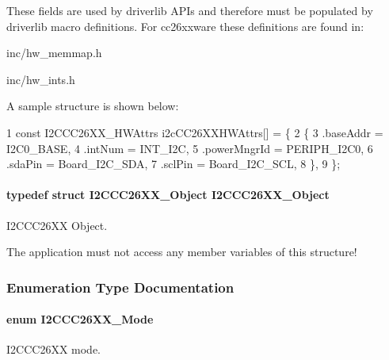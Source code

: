 These fields are used by driverlib A\+P\+Is and therefore must be populated by driverlib macro definitions. For cc26xxware these definitions are found in\+:
\begin{DoxyItemize}
\item inc/hw\+\_\+memmap.\+h
\item inc/hw\+\_\+ints.\+h
\end{DoxyItemize}

A sample structure is shown below\+: 
\begin{DoxyCode}
1 const I2CCC26XX\_HWAttrs i2cCC26XXHWAttrs[] = \{
2     \{
3        .baseAddr = I2C0\_BASE,
4        .intNum = INT\_I2C,
5        .powerMngrId = PERIPH\_I2C0,
6        .sdaPin = Board\_I2C\_SDA,
7        .sclPin = Board\_I2C\_SCL,
8     \},
9 \};
\end{DoxyCode}
\paragraph[{I2\+C\+C\+C26\+X\+X\+\_\+\+Object}]{\setlength{\rightskip}{0pt plus 5cm}typedef struct {\bf I2\+C\+C\+C26\+X\+X\+\_\+\+Object}  {\bf I2\+C\+C\+C26\+X\+X\+\_\+\+Object}}\label{_i2_c_c_c26_x_x_8h_a0eb1b66d08f9584c404d1610f8282394}


I2\+C\+C\+C26\+X\+X Object. 

The application must not access any member variables of this structure! 

\subsubsection{Enumeration Type Documentation}
\paragraph[{I2\+C\+C\+C26\+X\+X\+\_\+\+Mode}]{\setlength{\rightskip}{0pt plus 5cm}enum {\bf I2\+C\+C\+C26\+X\+X\+\_\+\+Mode}}\label{_i2_c_c_c26_x_x_8h_a9deb519e150efd12ccf7068efca5ee75}


I2\+C\+C\+C26\+X\+X mode. 


